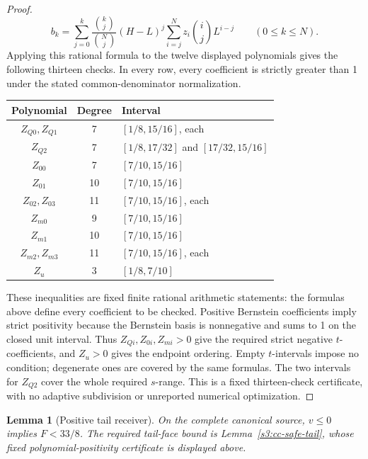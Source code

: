 \documentclass[11pt,reqno]{amsart}
\newtheorem{lemma}[theorem]{Lemma}
\theoremstyle{definition}
\theoremstyle{remark}
\begin{document}
\begin{proof}
\begin{equation}\label{s3:st-univariate-bernstein}
 b_k=\sum_{j=0}^k\frac{\binom{k}{j}}{\binom{N}{j}}
       (H-L)^j\sum_{i=j}^N z_i\binom{i}{j}L^{i-j}
       \qquad(0\le k\le N).
\end{equation}
Applying this rational formula to the twelve displayed polynomials
gives the following thirteen checks. In every row, every coefficient
is strictly greater than 1 under the stated common-denominator
normalization.
\begin{center}
\begin{tabular}{ccl}
\toprule
Polynomial&Degree&Interval\\
\midrule
\(Z_{Q0},Z_{Q1}\)&7&\([1/8,15/16]\), each\\
\(Z_{Q2}\)&7&\([1/8,17/32]\) and \([17/32,15/16]\)\\
\(Z_{00}\)&7&\([7/10,15/16]\)\\
\(Z_{01}\)&10&\([7/10,15/16]\)\\
\(Z_{02},Z_{03}\)&11&\([7/10,15/16]\), each\\
\(Z_{m0}\)&9&\([7/10,15/16]\)\\
\(Z_{m1}\)&10&\([7/10,15/16]\)\\
\(Z_{m2},Z_{m3}\)&11&\([7/10,15/16]\), each\\
\(Z_u\)&3&\([1/8,7/10]\)\\
\bottomrule
\end{tabular}
\end{center}
These inequalities are fixed finite rational arithmetic statements:
the formulas above define every coefficient to be checked. Positive
Bernstein coefficients imply strict positivity because the Bernstein
basis is nonnegative and sums to 1 on the closed unit interval.
Thus \(Z_{Qi},Z_{0i},Z_{mi}>0\) give the required strict
negative \(t\)-coefficients, and \(Z_u>0\) gives the endpoint
ordering. Empty \(t\)-intervals impose no condition; degenerate
ones are covered by the same formulas. The two intervals for
\(Z_{Q2}\) cover the whole required \(s\)-range.
This is a fixed thirteen-check certificate, with no adaptive
subdivision or unreported numerical optimization.
\end{proof}

\begin{lemma}[Positive tail receiver]
\label{s3:cc-positive-receiver}
On the complete canonical source, \(v\le0\) implies \(F<33/8\).
The required tail-face bound is Lemma~\ref{s3:cc-safe-tail}, whose fixed polynomial-positivity certificate is displayed above.
\end{lemma}
\end{document}
